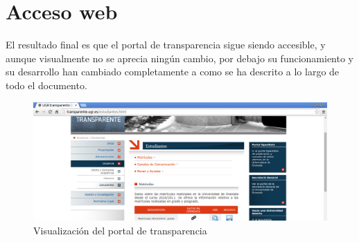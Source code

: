\section{Acceso web}

El resultado final es que el portal de transparencia sigue siendo accesible, y aunque visualmente no se aprecia ningún cambio, por debajo su funcionamiento y su desarrollo han cambiado completamente a como se ha descrito a lo largo de todo el documento.

\begin{figure}[!ht]
	\begin{center}
		\includegraphics[width=1\textwidth]{../images/transparente.png}
		\caption{Visualización del portal de transparencia}
		\label{fig:transparente}
	\end{center}
\end{figure}